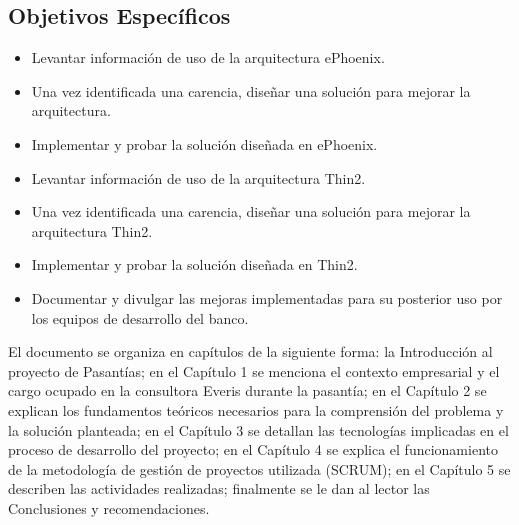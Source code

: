 \subsection*{Objetivos Específicos}
\begin{itemize}
  \item Levantar información de uso de la arquitectura ePhoenix.
  \item Una vez identificada una carencia, diseñar una solución para
        mejorar la arquitectura.
  \item Implementar y probar la solución diseñada en ePhoenix.
  \item Levantar información de uso de la arquitectura Thin2.
  \item Una vez identificada una carencia, diseñar una solución para
        mejorar la arquitectura Thin2.
  \item Implementar y probar la solución diseñada en Thin2.
  \item Documentar y divulgar las mejoras implementadas para su
        posterior uso por los equipos de desarrollo del banco.
\end{itemize}

El documento se organiza en capítulos de la siguiente forma: la
Introducción al proyecto de Pasantías; en el Capítulo 1 se menciona
el contexto empresarial y el cargo ocupado en la
consultora Everis durante la pasantía; en el Capítulo 2 se explican
los fundamentos teóricos necesarios para la comprensión del problema y
la solución planteada; en el Capítulo 3 se detallan las tecnologías
implicadas en el proceso de desarrollo del proyecto; en el Capítulo 4 se
explica el funcionamiento de la metodología de gestión de proyectos utilizada
(SCRUM); en el Capítulo 5 se describen las actividades realizadas;
finalmente se le dan al lector las Conclusiones y recomendaciones.
